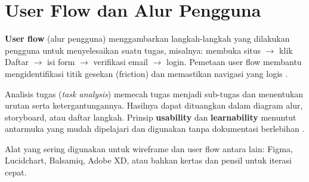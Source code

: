 \section{User Flow dan Alur Pengguna}

\textbf{User flow} (alur pengguna) menggambarkan langkah-langkah yang dilakukan pengguna untuk menyelesaikan suatu tugas, misalnya: membuka situs $\rightarrow$ klik Daftar $\rightarrow$ isi form $\rightarrow$ verifikasi email $\rightarrow$ login. Pemetaan user flow membantu mengidentifikasi titik gesekan (friction) dan memastikan navigasi yang logis \cite{mdn-learn}.

Analisis tugas (\textit{task analysis}) memecah tugas menjadi sub-tugas dan menentukan urutan serta ketergantungannya. Hasilnya dapat dituangkan dalam diagram alur, storyboard, atau daftar langkah. Prinsip \textbf{usability} dan \textbf{learnability} menuntut antarmuka yang mudah dipelajari dan digunakan tanpa dokumentasi berlebihan \cite{mdn-learn}.

Alat yang sering digunakan untuk wireframe dan user flow antara lain: Figma, Lucidchart, Balsamiq, Adobe XD, atau bahkan kertas dan pensil untuk iterasi cepat.
